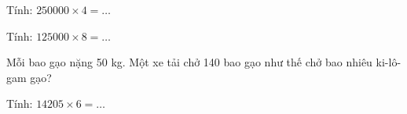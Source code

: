\begin{ex}
Tính: $250000 \times 4 = \dots$
\end{ex}

\begin{ex}
Tính: $125000 \times 8 = \dots$
\end{ex}

\begin{ex}
Mỗi bao gạo nặng 50 kg. Một xe tải chở 140 bao gạo như thế chở bao nhiêu ki-lô-gam gạo?
\end{ex}

\begin{ex}
Tính: $14205 \times 6 = \dots$
\end{ex}

